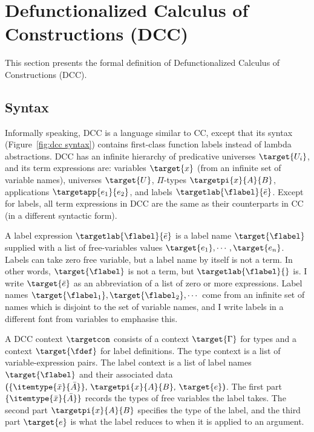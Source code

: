 
\section{Defunctionalized Calculus of\\Constructions (DCC)}

This section presents the formal definition of Defunctionalized Calculus of Constructions (DCC).

\subsection{Syntax}
Informally speaking, DCC is a language similar to CC, except that its syntax (Figure~\ref{fig:dcc syntax}) contains first-class function labels instead of lambda abstractions.
DCC has an infinite hierarchy of predicative universes $\target{U_i}$, and its term expressions are: variables $\target{x}$ (from an infinite set of variable names), universes $\target{U}$, $\Pi$-types $\targetpi{x}{A}{B}$, applications $\targetapp{e_1}{e_2}$, and labels $\targetlab{\flabel}{\bar{e}}$. Except for labels, all term expressions in DCC are the same as their counterparts in CC (in a different syntactic form).

A label expression $\targetlab{\flabel}{\bar{e}}$ is a label name $\target{\flabel}$ supplied with a list of free-variables values $\target{e_1}, \cdots, \target{e_n}$. Labels can take zero free variable, but a label name by itself is not a term. In other words, $\target{\flabel}$ is not a term, but $\targetlab{\flabel}{}$ is. I write $\target{\bar{e}}$ as an abbreviation of a list of zero or more expressions. Label names $\target{\flabel_1}, \target{\flabel_2}, \cdots$ come from an infinite set of names which is disjoint to the set of variable names, and I write labels in a different font from variables to emphasise this.

A DCC context $\targetcon$ consists of a context $\target{\Gamma}$ for types and a context $\target{\fdef}$ for label definitions. The type context is a list of variable-expression pairs. The label context is a list of label names $\target{\flabel}$ and their associated data 
$\textsf{(}\{\itemtype{\bar{x}}{\bar{A}}\}\textsf{,}\ \targetpi{x}{A}{B} \textsf{,}\ \target{e} \textsf{)}$. 
The first part $\{\itemtype{\bar{x}}{\bar{A}}\}$ records the types of free variables the label takes. 
The second part $\targetpi{x}{A}{B}$ specifies the type of the label, and the third part $\target{e}$ is what the label reduces to when it is applied to an argument.

